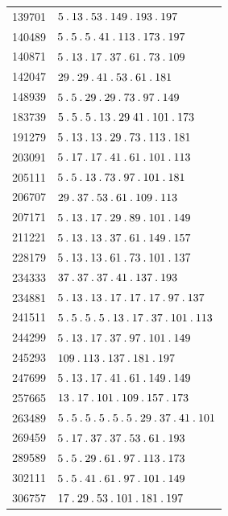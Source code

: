 \begin{longtable}{@{}r|l@{}}
139701 & $5\pdot 13\pdot 53\pdot 149\pdot 193\pdot 197$\\
140489 & $5\pdot 5\pdot 5\pdot 41\pdot 113\pdot 173\pdot 197$\\
140871 & $5\pdot 13\pdot 17\pdot 37\pdot 61\pdot 73\pdot 109$\\
142047 & $29\pdot 29\pdot 41\pdot 53\pdot 61\pdot 181$\\
148939 & $5\pdot 5\pdot 29\pdot 29\pdot 73\pdot 97\pdot 149$\\
183739 & $5\pdot 5\pdot 5\pdot 13\pdot 29\;41\pdot 101\pdot 173$\\
191279 & $5\pdot 13\pdot 13\pdot 29\pdot 73\pdot 113\pdot 181$\\
203091 & $5\pdot 17\pdot 17\pdot 41\pdot 61\pdot 101\pdot 113$\\
205111 & $5\pdot 5\pdot 13\pdot 73\pdot 97\pdot 101\pdot 181$\\
206707 & $29\pdot 37\pdot 53\pdot 61\pdot 109\pdot 113$\\
207171 & $5\pdot 13\pdot 17\pdot 29\pdot 89\pdot 101\pdot 149$\\
211221 & $5\pdot 13\pdot 13\pdot 37\pdot 61\pdot 149\pdot 157$\\
228179 & $5\pdot 13\pdot 13\pdot 61\pdot 73\pdot 101\pdot 137$\\
234333 & $37\pdot 37\pdot 37\pdot 41\pdot 137\pdot 193$\\
234881 & $5\pdot 13\pdot 13\pdot 17\pdot 17\pdot 17\pdot 97\pdot 137$\\
241511 & $5\pdot 5\pdot 5\pdot 5\pdot 13\pdot 17\pdot 37\pdot 101\pdot 113$\\
244299 & $5\pdot 13\pdot 17\pdot 37\pdot 97\pdot 101\pdot 149$\\
245293 & $109\pdot 113\pdot 137\pdot 181\pdot 197$\\
247699 & $5\pdot 13\pdot 17\pdot 41\pdot 61\pdot 149\pdot 149$\\
257665 & $13\pdot 17\pdot 101\pdot 109\pdot 157\pdot 173$\\
263489 & $5\pdot 5\pdot 5\pdot 5\pdot 5\pdot 5\pdot 29\pdot 37\pdot 41\pdot 101$\\
269459 & $5\pdot 17\pdot 37\pdot 37\pdot 53\pdot 61\pdot 193$\\
289589 & $5\pdot 5\pdot 29\pdot 61\pdot 97\pdot 113\pdot 173$\\
302111 & $5\pdot 5\pdot 41\pdot 61\pdot 97\pdot 101\pdot 149$\\
306757 & $17\pdot 29\pdot 53\pdot 101\pdot 181\pdot 197$\\

\end{longtable}
